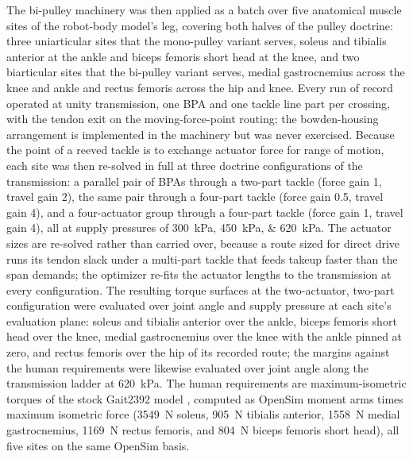 \documentclass[utf8]{FrontiersinHarvard} %
\begin{document}
The bi-pulley machinery was then applied as a batch over five anatomical muscle sites of the robot-body model's leg, covering both halves of the pulley doctrine: three uniarticular sites that the mono-pulley variant serves, soleus and tibialis anterior at the ankle and biceps femoris short head at the knee, and two biarticular sites that the bi-pulley variant serves, medial gastrocnemius across the knee and ankle and rectus femoris across the hip and knee. Every run of record operated at unity transmission, one BPA and one tackle line part per crossing, with the tendon exit on the moving-force-point routing; the bowden-housing arrangement is implemented in the machinery but was never exercised. Because the point of a reeved tackle is to exchange actuator force for range of motion, each site was then re-solved in full at three doctrine configurations of the transmission: a parallel pair of BPAs through a two-part tackle (force gain 1, travel gain 2), the same pair through a four-part tackle (force gain 0.5, travel gain 4), and a four-actuator group through a four-part tackle (force gain 1, travel gain 4), all at supply pressures of \qtylist{300;450;620}{\kPa}. The actuator sizes are re-solved rather than carried over, because a route sized for direct drive runs its tendon slack under a multi-part tackle that feeds takeup faster than the span demands; the optimizer re-fits the actuator lengths to the transmission at every configuration. The resulting torque surfaces at the two-actuator, two-part configuration were evaluated over joint angle and supply pressure at each site's evaluation plane: soleus and tibialis anterior over the ankle, biceps femoris short head over the knee, medial gastrocnemius over the knee with the ankle pinned at zero, and rectus femoris over the hip of its recorded route; the margins against the human requirements were likewise evaluated over joint angle along the transmission ladder at \qty{620}{\kPa}. The human requirements are maximum-isometric torques of the stock Gait2392 model \citep{delp_opensim_2007, seth_opensim_2018}, computed as OpenSim moment arms times maximum isometric force (\qty{3549}{\N} soleus, \qty{905}{\N} tibialis anterior, \qty{1558}{\N} medial gastrocnemius, \qty{1169}{\N} rectus femoris, and \qty{804}{\N} biceps femoris short head), all five sites on the same OpenSim basis.
\end{document}
